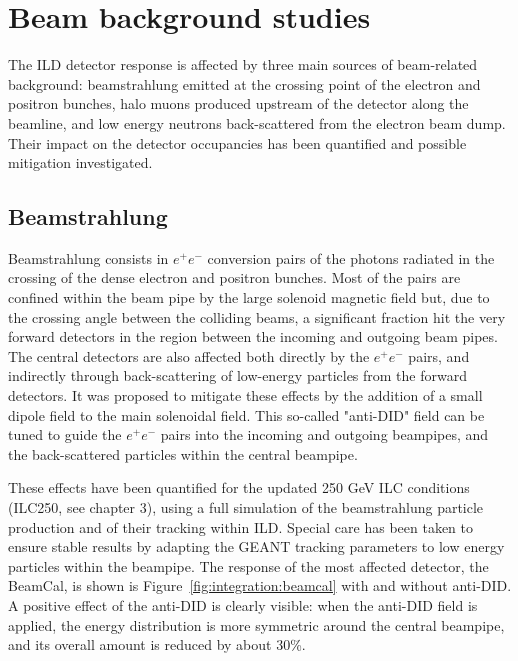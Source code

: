 \vspace{2cm}

\section{Beam background studies}

The ILD detector response is affected by three main sources of beam-related background: beamstrahlung emitted at the crossing point of the electron and positron bunches, halo muons produced upstream of the detector along the beamline, and low energy neutrons back-scattered from the electron beam dump. Their impact on the detector occupancies has been quantified and possible mitigation investigated.

\subsection{Beamstrahlung}

Beamstrahlung consists in $e^+e^-$ conversion pairs of the photons radiated in the crossing of the dense electron and positron bunches. Most of the pairs are confined within the beam pipe by the large solenoid magnetic field but, due to the crossing angle between the colliding beams, a significant fraction hit the very forward detectors in the region between the incoming and outgoing beam pipes. The central detectors are also affected both directly by the $e^+e^-$ pairs, and indirectly through back-scattering of low-energy particles from the forward detectors. It was proposed to mitigate these effects by the addition of a small dipole field to the main solenoidal field. This so-called "anti-DID" field can be tuned to guide the $e^+e^-$ pairs into the incoming and outgoing beampipes, and the back-scattered particles within the central beampipe. 

These effects have been quantified for the updated 250 GeV ILC conditions (ILC250, see chapter 3), using a full simulation of the beamstrahlung particle production and of their tracking within ILD. Special care has been taken to ensure stable results by adapting the GEANT tracking parameters to low energy particles within the beampipe. The response of the most affected detector, the BeamCal, is shown is Figure~\ref{fig:integration:beamcal} with and without anti-DID. A positive effect of the anti-DID is clearly visible: when the anti-DID field is applied, the energy distribution is more symmetric around the central beampipe, and its overall amount is reduced by about 30\%.

